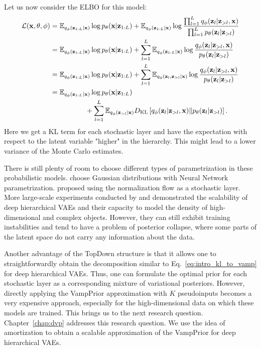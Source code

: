 Let us now consider the ELBO for this model:
\begin{align}
    \mathcal{L}({\mathbf{x}}, \theta, \phi) &= \mathbb{E}_{q_{\phi}({\mathbf{z}}_{1:L}|{\mathbf{x}})}\log p_{\theta}({\mathbf{x}}|{\mathbf{z}}_{1:L}) + \mathbb{E}_{q_{\phi}({\mathbf{z}}_{1:L}|{\mathbf{x}})} \log \frac{\prod_{l=1}^L q_{\phi}({\mathbf{z}}_l|{\mathbf{z}}_{>l}, {\mathbf{x}})}{\prod_{l=1}^L p_{\theta}({\mathbf{z}}_l|{\mathbf{z}}_{>l})} \\
    &=\mathbb{E}_{q_{\phi}({\mathbf{z}}_{1:L}|{\mathbf{x}})}\log p_{\theta}({\mathbf{x}}|{\mathbf{z}}_{1:L}) +  \sum_{l=1}^L \mathbb{E}_{q_{\phi}({\mathbf{z}}_{1:L}|{\mathbf{x}})}\log \frac{ q_{\phi}({\mathbf{z}}_l|{\mathbf{z}}_{>l}, {\mathbf{x}})}{p_{\theta}({\mathbf{z}}_l|{\mathbf{z}}_{>l})} \\
    &=\mathbb{E}_{q_{\phi}({\mathbf{z}}_{1:L}|{\mathbf{x}})}\log p_{\theta}({\mathbf{x}}|{\mathbf{z}}_{1:L}) +  \sum_{l=1}^L \mathbb{E}_{q_{\phi}({\mathbf{z}}_{l},{\mathbf{z}}_{>l}| {\mathbf{x}})}\log \frac{ q_{\phi}({\mathbf{z}}_l|{\mathbf{z}}_{>l}, {\mathbf{x}})}{p_{\theta}({\mathbf{z}}_l|{\mathbf{z}}_{>l})} \\
    &=\mathbb{E}_{q_{\phi}({\mathbf{z}}_{1:L}|{\mathbf{x}})}\log p_{\theta}({\mathbf{x}}|{\mathbf{z}}_{1:L}) \notag\\
    &\quad\quad\quad\quad\quad +  \sum_{l=1}^L \mathbb{E}_{q_{\phi}({\mathbf{z}}_{>l}| {\mathbf{x}})}D_{\mathrm{KL}}\left[q_{\phi}({\mathbf{z}}_l|{\mathbf{z}}_{>l}, {\mathbf{x}})\|p_{\theta}({\mathbf{z}}_l|{\mathbf{z}}_{>l})\right].
\end{align}
Here we get a KL term for each stochastic layer and have the expectation with respect to the latent variable "higher" in the hierarchy. 
This might lead to a lower variance of the Monte Carlo estimates.

There is still plenty of room to choose different types of parametrization in these probabilistic models. 
\citet{sonderby2016ladder} choose Gaussian distributions with Neural Network parametrization. 
\citet{kingma2016improved} proposed using the normalization flow as a stochastic layer. 
More large-scale experiments conducted by \citet{vahdat2020nvae} and \citet{Child2020-ze} demonstrated the scalability of deep hierarchical VAEs and their capacity to model the density of high-dimensional and complex objects.
However, they can still exhibit training instabilities and tend to have a problem of posterior collapse, where some parts of the latent space do not carry any information about the data. 

Another advantage of the TopDown structure is that it allows one to straightforwardly obtain the decomposition similar to Eq.~\ref{eq:intro_kl_to_vamp} for deep hierarchical VAEs. Thus, one can formulate the optimal prior for each stochastic layer as a corresponding mixture of variational posteriors. 
However, directly applying the VampPrior approximation with $K$ pseudoinputs becomes a very expensive approach, especially for the high-dimensional data on which these models are trained. 
This brings us to the next research question.
Chapter~\ref{chap:dvp} addresses this research question. We use the idea of amortization to obtain a scalable approximation of the VampPrior for deep hierarchical VAEs. 

